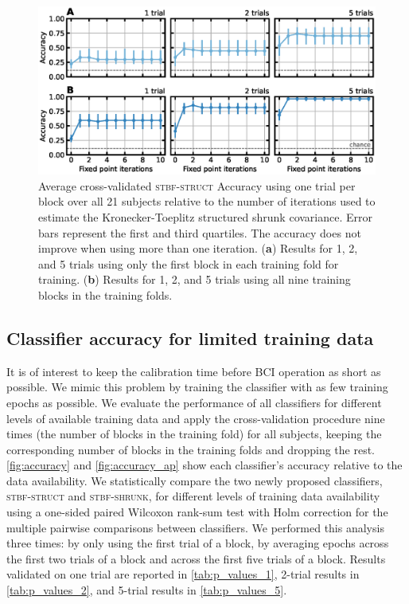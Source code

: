   \begin{figure}
		\includegraphics[width=\linewidth]{figures/stbf_struct/fpi.eps}
		\caption{Average cross-validated \textsc{stbf-struct} Accuracy using
			one trial per block over all 21 subjects
			relative to the number of iterations used to estimate the Kronecker-Toeplitz structured shrunk
			covariance. Error bars represent the first and third quartiles. The
			accuracy does not improve when using more than one iteration.
			(\textbf{a}) Results for 1, 2, and 5 trials using only the first block in each
			training fold for training. (\textbf{b}) Results
			for 1, 2, and 5 trials using
			all nine training blocks in the training folds.
		}
		\label{fig:iterations}
	\end{figure}

	\subsection{Classifier accuracy for limited training data}
	It is of interest to keep the calibration time before BCI
	operation as short as possible.
	We mimic this problem by training the classifier with as few training epochs as possible.
	We evaluate the performance of all classifiers for different levels of
	available training data and apply the cross-validation procedure nine times (the number of blocks in the training fold) for all subjects, keeping the
	corresponding number of blocks in the training folds and dropping the rest.
	\autoref{fig:accuracy} and \autoref{fig:accuracy_ap} show each classifier's
	accuracy relative to the data availability.
	We statistically compare the two newly proposed classifiers,
	\textsc{stbf-struct} and \textsc{stbf-shrunk}, for different levels of training
	data availability using a one-sided paired Wilcoxon rank-sum test with Holm correction for the multiple pairwise comparisons between classifiers.
	We performed this analysis three times: by only using the first trial of a
	block, by averaging epochs across the first two trials of a block and across
	the first five trials of a block.
	Results validated on one trial are reported in \autoref{tab:p_values_1}, 2-trial results
	in \autoref{tab:p_values_2}, and 5-trial results in \autoref{tab:p_values_5}.

